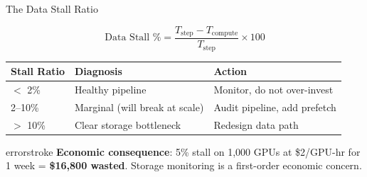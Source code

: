 \documentclass[aspectratio=169, 12pt]{beamer}
\begin{document}
\begin{frame}{The Data Stall Ratio}

\small
$$\text{Data Stall \%} = \frac{T_{\text{step}} - T_{\text{compute}}}{T_{\text{step}}} \times 100$$

\vspace{0.15cm}
\renewcommand{\arraystretch}{1.15}
{\footnotesize
\begin{tabular}{@{}lll@{}}
  \toprule
  \textbf{Stall Ratio} & \textbf{Diagnosis} & \textbf{Action} \\
  \midrule
  $<$ 2\%   & Healthy pipeline            & Monitor, do not over-invest \\
  2--10\%   & Marginal (will break at scale) & Audit pipeline, add prefetch \\
  $>$ 10\%  & \textcolor{errorstroke}{Clear storage bottleneck}   & \textcolor{errorstroke}{Redesign data path} \\
  \bottomrule
\end{tabular}
}

\vspace{0.15cm}
\begin{mlsyscard}{errorstroke}
{\footnotesize \textbf{Economic consequence}: 5\% stall on 1,000 GPUs at \$2/GPU-hr for 1 week = \textbf{\$16,800 wasted}. Storage monitoring is a first-order economic concern.}
\end{mlsyscard}

\end{frame}
\end{document}
